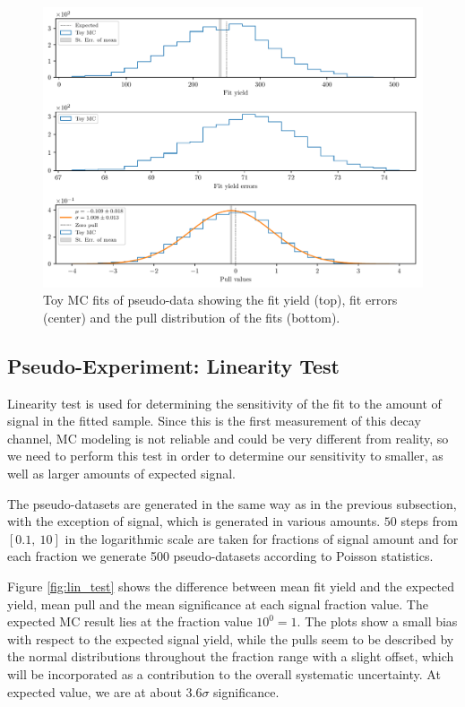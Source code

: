\begin{figure}[H]
	\centering
	\captionsetup{width=0.8\linewidth}
	\includegraphics[width=\linewidth]{fig/toyMC}
	\caption{Toy MC fits of pseudo-data showing the fit yield (top), fit errors (center) and the pull distribution of the fits (bottom).}
	\label{fig:toyMC}
\end{figure}

\subsection{Pseudo-Experiment: Linearity Test}
\label{sec:pseudo-experiment-linearity-test}
Linearity test is used for determining the sensitivity of the fit to the amount of signal in the fitted sample. Since this is the first measurement of this decay channel, MC modeling is not reliable and could be very different from reality, so we need to perform this test in order to determine our sensitivity to smaller, as well as larger amounts of expected signal.

The pseudo-datasets are generated in the same way as in the previous subsection, with the exception of signal, which is generated in various amounts. $50$ steps from $[0.1,~10]$ in the logarithmic scale are taken for fractions of signal amount and for each fraction we generate 500 pseudo-datasets according to Poisson statistics.

Figure \ref{fig:lin_test} shows the difference between mean fit yield and the expected yield, mean pull and the mean significance at each signal fraction value. The expected MC result lies at the fraction value $10^0 = 1$. The plots show a small bias with respect to the expected signal yield, while the pulls seem to be described by the normal distributions throughout the fraction range with a slight offset, which will be incorporated as a contribution to the overall systematic uncertainty. At expected value, we are at about $3.6\sigma$ significance.

